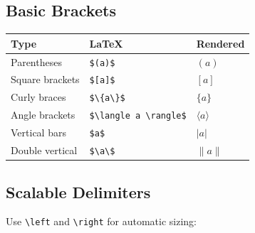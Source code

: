 \documentclass[
  letterpaper,
  DIV=11,
  numbers=noendperiod]{scrartcl}
\begin{document}
\hypertarget{basic-brackets}{%
\subsection{Basic Brackets}\label{basic-brackets}}

\begin{longtable}[]{@{}lll@{}}
\toprule()
Type & LaTeX & Rendered \\
\midrule()
\endhead
Parentheses & \texttt{\$(a)\$} & \((a)\) \\
Square brackets & \texttt{\${[}a{]}\$} & \([a]\) \\
Curly braces & \texttt{\$\textbackslash{}\{a\textbackslash{}\}\$} &
\(\{a\}\) \\
Angle brackets &
\texttt{\$\textbackslash{}langle\ a\ \textbackslash{}rangle\$} &
\(\langle a \rangle\) \\
Vertical bars & \texttt{\$\textbar{}a\textbar{}\$} & \(|a|\) \\
Double vertical &
\texttt{\$\textbackslash{}\textbar{}a\textbackslash{}\textbar{}\$} &
\(\|a\|\) \\
\bottomrule()
\end{longtable}

\hypertarget{scalable-delimiters}{%
\subsection{Scalable Delimiters}\label{scalable-delimiters}}

Use \texttt{\textbackslash{}left} and \texttt{\textbackslash{}right} for
automatic sizing:
\end{document}
